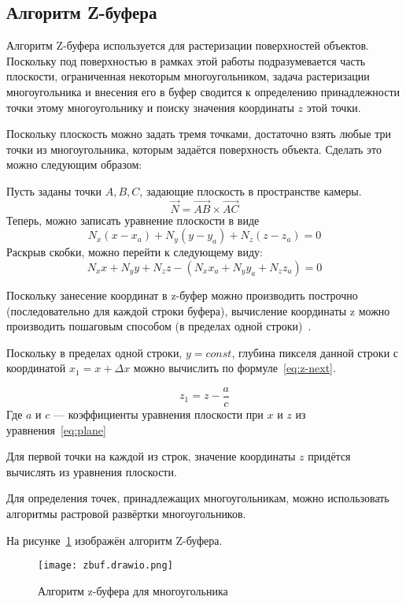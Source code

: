 \subsection{Алгоритм Z-буфера}

Алгоритм Z-буфера используется для растеризации поверхностей объектов. Поскольку под поверхностью в рамках этой работы подразумевается часть плоскости, ограниченная некоторым многоугольником, задача растеризации многоугольника и внесения его в буфер сводится к определению принадлежности точки этому многоугольнику и поиску значения координаты $z$ этой точки.

Поскольку плоскость можно задать тремя точками, достаточно взять любые три точки из многоугольника, которым задаётся поверхность объекта. Сделать это можно следующим образом:

Пусть заданы точки $A, B, C$, задающие плоскость в пространстве камеры. $$ \vec{N} = \vec{AB} \times \vec{AC} $$
Теперь, можно записать уравнение плоскости в виде
$$ N_x(x-x_a) + N_y(y-y_a) + N_z(z-z_a) = 0 $$
Раскрыв скобки, можно перейти к следующему виду:
\begin{equation}
    N_xx + N_yy + N_zz - (N_xx_a + N_yy_a + N_zz_a) = 0
    \label{eq:plane}
\end{equation}

Поскольку занесение координат в z-буфер можно производить построчно (последовательно для каждой строки буфера), вычисление координаты z можно производить пошаговым способом (в пределах одной строки)~\cite{Rogers}.

Поскольку в пределах одной строки, $y = const$, глубина пикселя данной строки с координатой $x_1 = x + \Delta x$ можно вычислить по формуле~\ref{eq:z-next}.

\begin{equation}
    z_1 = z - \frac{ a}{ c}
    \label{eq:z-next}
\end{equation}
Где $a$ и $c$ --- коэффициенты уравнения плоскости при $x$ и $z$ из уравнения~\ref{eq:plane}

Для первой точки на каждой из строк, значение координаты $z$ придётся вычислять из уравнения плоскости.

Для определения точек, принадлежащих многоугольникам, можно использовать алгоритмы растровой развёртки многоугольников.

На рисунке~\ref{fig:z-buffer} изображён алгоритм Z-буфера.

\begin{figure}[h!]
    \texttt{[image: zbuf.drawio.png]}
    \caption{Алгоритм z-буфера для многоугольника}
    \label{fig:z-buffer}
\end{figure}